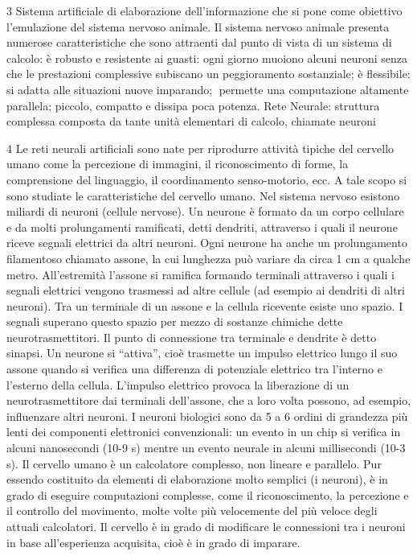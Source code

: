 \documentclass[12pt,a4paper,oneside]{book}
\begin{document}
		3 Sistema artificiale di elaborazione dell’informazione che si pone come obiettivo l’emulazione del sistema nervoso animale. Il sistema nervoso animale presenta numerose caratteristiche che sono attraenti dal punto di vista di un sistema di calcolo: è robusto e resistente ai guasti: ogni giorno muoiono alcuni neuroni senza che le prestazioni complessive subiscano un peggioramento sostanziale; è flessibile: si adatta alle situazioni nuove imparando; permette una computazione altamente parallela;  piccolo, compatto e dissipa poca potenza. Rete Neurale: struttura complessa composta da tante unità elementari di calcolo, chiamate neuroni 
		
		4 Le reti neurali artificiali sono nate per riprodurre attività tipiche del cervello umano come la percezione di immagini, il riconoscimento di forme, la comprensione del linguaggio, il coordinamento senso-motorio, ecc.  A tale scopo si sono studiate le caratteristiche del cervello umano. Nel sistema nervoso esistono miliardi di neuroni (cellule nervose). Un neurone è formato da un corpo cellulare e da molti prolungamenti ramificati, detti dendriti, attraverso i quali il neurone riceve segnali elettrici da altri neuroni. Ogni neurone ha anche un prolungamento filamentoso chiamato assone, la cui lunghezza può variare da circa 1 cm a qualche metro. All’estremità l’assone si ramifica formando terminali attraverso i quali i segnali elettrici vengono trasmessi ad altre cellule (ad esempio ai dendriti di altri neuroni). Tra un terminale di un assone e la cellula ricevente esiste uno spazio. I segnali superano questo spazio per mezzo di sostanze chimiche dette neurotrasmettitori. Il punto di connessione tra terminale e dendrite è detto sinapsi. Un neurone si “attiva”, cioè trasmette un impulso elettrico lungo il suo assone quando si verifica una differenza di potenziale elettrico tra l’interno e l’esterno della cellula. L’impulso elettrico provoca la liberazione di un neurotrasmettitore dai terminali dell’assone, che a loro volta possono, ad esempio, influenzare altri neuroni. I neuroni biologici sono da 5 a 6 ordini di grandezza più lenti dei componenti elettronici convenzionali: un evento in un chip si verifica in alcuni nanosecondi (10-9 s) mentre un evento neurale in alcuni millisecondi (10-3 s). Il cervello umano è un calcolatore complesso, non lineare e parallelo. Pur essendo costituito da elementi di elaborazione molto semplici (i neuroni), è in grado di eseguire computazioni complesse, come il riconoscimento, la percezione e il controllo del movimento, molte volte più velocemente del più veloce degli attuali calcolatori. Il cervello è in grado di modificare le connessioni tra i neuroni in base all’esperienza acquisita, cioè è in grado di imparare. 
		
\end{document}
